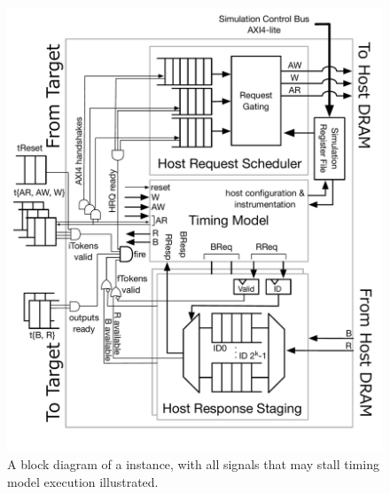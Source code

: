 \begin{figure}[t]
	\centering
    \vspace{-0.10in}
	\includegraphics[width=\columnwidth]{figures/memory-model-block-diagram.pdf}
    \vspace{-0.45in}
    \caption{A block diagram of a \PNAME instance, with all signals
    that may stall timing model execution illustrated.}
	\label{fig:timing-model}
\vspace{-0.25in}
\end{figure}

